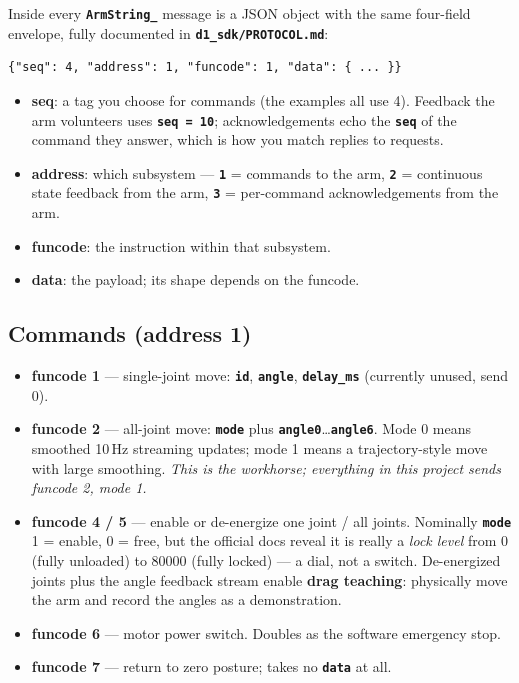 \documentclass[11pt,twoside,openright]{book}
\newcommand{\code}[1]{\texttt{\bfseries #1}}
\begin{document}
Inside every \code{ArmString\_} message is a JSON object with the same
four-field envelope, fully documented in \code{d1\_sdk/PROTOCOL.md}:

\begin{lstlisting}[style=pktyaml]
{"seq": 4, "address": 1, "funcode": 1, "data": { ... }}
\end{lstlisting}

\begin{itemize}
  \item \textbf{seq}: a tag you choose for commands (the examples all use
    4). Feedback the arm volunteers uses \code{seq = 10};
    acknowledgements echo the \code{seq} of the command they answer, which
    is how you match replies to requests.
  \item \textbf{address}: which subsystem --- \code{1} = commands to the
    arm, \code{2} = continuous state feedback from the arm, \code{3} =
    per-command acknowledgements from the arm.
  \item \textbf{funcode}: the instruction within that subsystem.
  \item \textbf{data}: the payload; its shape depends on the funcode.
\end{itemize}

\subsection{Commands (address 1)}

\begin{itemize}
  \item \textbf{funcode 1} --- single-joint move: \code{id},
    \code{angle}, \code{delay\_ms} (currently unused, send 0).
  \item \textbf{funcode 2} --- all-joint move: \code{mode} plus
    \code{angle0}\ldots\code{angle6}. Mode 0 means smoothed 10\,Hz
    streaming updates; mode 1 means a trajectory-style move with large
    smoothing. \emph{This is the workhorse; everything in this project
    sends funcode 2, mode 1.}
  \item \textbf{funcode 4 / 5} --- enable or de-energize one joint / all
    joints. Nominally \code{mode} 1 = enable, 0 = free, but the official
    docs reveal it is really a \emph{lock level} from 0 (fully unloaded)
    to 80000 (fully locked) --- a dial, not a switch. De-energized
    joints plus the angle feedback stream enable \textbf{drag teaching}:
    physically move the arm and record the angles as a demonstration.
  \item \textbf{funcode 6} --- motor power switch. Doubles as the
    software emergency stop.
  \item \textbf{funcode 7} --- return to zero posture; takes no
    \code{data} at all.
\end{itemize}
\end{document}
